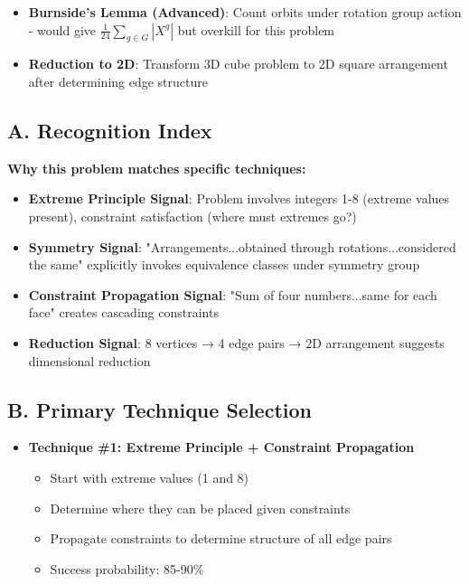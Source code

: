 \documentclass[]{article}
\begin{document}
\begin{tacticalbox}
\begin{itemize}[leftmargin=*]
    \item \textbf{Burnside's Lemma (Advanced)}: Count orbits under rotation group action - would give $\frac{1}{24}\sum_{g \in G} |X^g|$ but overkill for this problem
    
    \item \textbf{Reduction to 2D}: Transform 3D cube problem to 2D square arrangement after determining edge structure
\end{itemize}
\end{tacticalbox}

\begin{techniquesbox}
\subsection*{A. Recognition Index}
\textbf{Why this problem matches specific techniques:}
\begin{itemize}[leftmargin=*]
    \item \textbf{Extreme Principle Signal}: Problem involves integers 1-8 (extreme values present), constraint satisfaction (where must extremes go?)
    
    \item \textbf{Symmetry Signal}: "Arrangements...obtained through rotations...considered the same" explicitly invokes equivalence classes under symmetry group
    
    \item \textbf{Constraint Propagation Signal}: "Sum of four numbers...same for each face" creates cascading constraints
    
    \item \textbf{Reduction Signal}: 8 vertices → 4 edge pairs → 2D arrangement suggests dimensional reduction
\end{itemize}

\subsection*{B. Primary Technique Selection}
\begin{itemize}[leftmargin=*]
    \item \textbf{Technique \#1: Extreme Principle + Constraint Propagation}
    \begin{itemize}
        \item Start with extreme values (1 and 8)
        \item Determine where they can be placed given constraints
        \item Propagate constraints to determine structure of all edge pairs
        \item Success probability: 85-90\%
    \end{itemize}
    

\end{itemize}
\end{techniquesbox}
\end{document}
